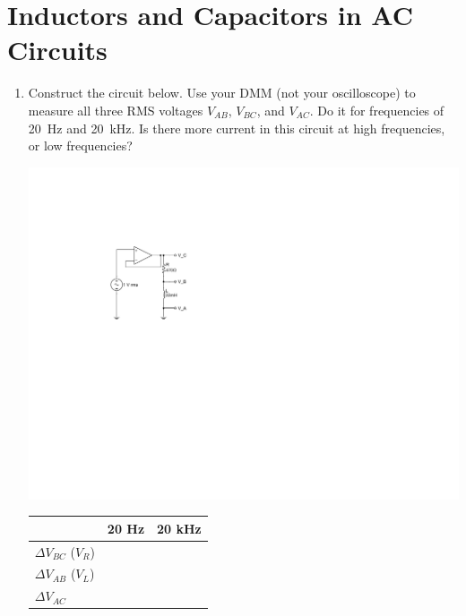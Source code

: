 \section{Inductors and Capacitors in AC Circuits }
\label{lab_ac_circuits}


\bigskip

\begin{enumerate}[wide]

\item Construct the circuit below.  Use your DMM (not your oscilloscope) to measure all three RMS voltages $V_{AB}$,  $V_{BC}$, and $V_{AC}$.  Do it for frequencies of 20~Hz and 20~kHz.  Is there more current in this circuit at high frequencies, or low frequencies? 

\begin{minipage}{.55\textwidth}
\begin{center}
\includegraphics{ac_circuits/RandL.pdf}
\end{center}
\end{minipage}
\begin{minipage}{.4\textwidth}
\begin{center} 
\begin{tabular}{|l|c|c|} 
\hline & 20 Hz & 20 kHz \\ 
\hline $\Delta V_{BC}$ ($V_R$) & & \\ 
\hline $\Delta V_{AB}$ ($V_L$) & & \\ 
\hline $\Delta V_{AC}$ & & \\ 
\hline 
\end{tabular} 
\end{center}
\end{minipage}



\end{enumerate}
